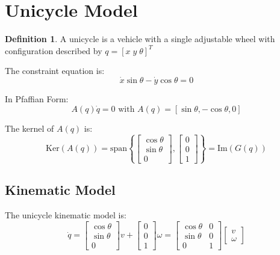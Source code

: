 \documentclass[openany]{book}
\theoremstyle{definition}
\newtheorem{definition}{Definition}[section]
\theoremstyle{remark}
\begin{document}
\section{Unicycle Model}

\begin{definition}
A unicycle is a vehicle with a single adjustable wheel with configuration described by $q = [x \; y \; \theta]^T$
\end{definition}

The constraint equation is:
\begin{equation}
    \dot{x}\sin\theta - \dot{y}\cos\theta = 0
\end{equation}

In Pfaffian Form:
\begin{equation}
    A(q)\dot{q} = 0 \text{ with } A(q) = [\sin\theta, -\cos\theta, 0]
\end{equation}

The kernel of $A(q)$ is:
\begin{equation}
    \text{Ker}(A(q)) = \text{span}\left\{\begin{bmatrix}\cos\theta \\ \sin\theta \\ 0\end{bmatrix}, \begin{bmatrix}0 \\ 0 \\ 1\end{bmatrix}\right\} = \text{Im}(G(q))
\end{equation}

\subsection{Kinematic Model}
The unicycle kinematic model is:
\begin{equation}
    \dot{q} = \begin{bmatrix}\cos\theta \\ \sin\theta \\ 0\end{bmatrix}v + \begin{bmatrix}0 \\ 0 \\ 1\end{bmatrix}\omega = \begin{bmatrix}\cos\theta & 0 \\ \sin\theta & 0 \\ 0 & 1\end{bmatrix}\begin{bmatrix}v \\ \omega\end{bmatrix}
\end{equation}
\end{document}
